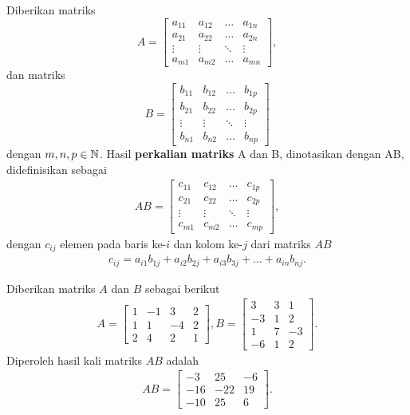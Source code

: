 \begin{definisi}
    Diberikan matriks $$A=\begin{bmatrix}
a_{11} & a_{12} & \dots & a_{1n}\\
a_{21} & a_{22} & \dots & a_{2n}\\
\vdots & \vdots & \ddots & \vdots\\
a_{m1} & a_{m2} & \dots & a_{mn}
\end{bmatrix},$$ dan matriks $$B=\begin{bmatrix}
b_{11} & b_{12} & \dots & b_{1p}\\
b_{21} & b_{22} & \dots & b_{2p}\\
\vdots & \vdots & \ddots & \vdots\\
b_{n1} & b_{n2} & \dots & b_{np}
\end{bmatrix}$$ dengan $m,n,p \in \mathbb{N}$.
 Hasil \textbf{perkalian matriks} A dan B, dinotasikan dengan AB, didefinisikan sebagai
\begin{align*}
AB=\begin{bmatrix}
c_{11} & c_{12} & \dots & c_{1p}\\
c_{21} & c_{22} & \dots & c_{2p}\\
\vdots & \vdots & \ddots & \vdots\\
c_{m1} & c_{m2} & \dots & c_{mp}
\end{bmatrix},
    \end{align*}
    dengan $c_{ij}$ elemen pada baris ke-$i$ dan kolom ke-$j$ dari matriks $AB$
    \begin{align*}
        c_{ij}=a_{i1}b_{1j}+a_{i2}b_{2j}+a_{i3}b_{3j}+\dots+a_{in}b_{nj}.
    \end{align*}
\end{definisi}
\begin{contoh}
Diberikan matriks $A$ dan $B$ sebagai berikut
    \begin{gather*}
        A=
        \begin{bmatrix}
            1 & -1 & 3 & 2\\
            1 & 1 & -4 & 2\\
            2 & 4 & 2 & 1
        \end{bmatrix},
        B=
        \begin{bmatrix}
            3 & 3 & 1\\
            -3 & 1 & 2\\
            1 & 7 & -3\\
            -6 & 1 & 2
        \end{bmatrix}.
    \end{gather*}
    Diperoleh hasil kali matriks $AB$ adalah
    \begin{gather*}
        AB=
        \begin{bmatrix}
            -3 & 25 & -6\\
            -16 & -22 & 19\\
            -10 & 25 & 6
        \end{bmatrix}.
    \end{gather*}
\end{contoh}

